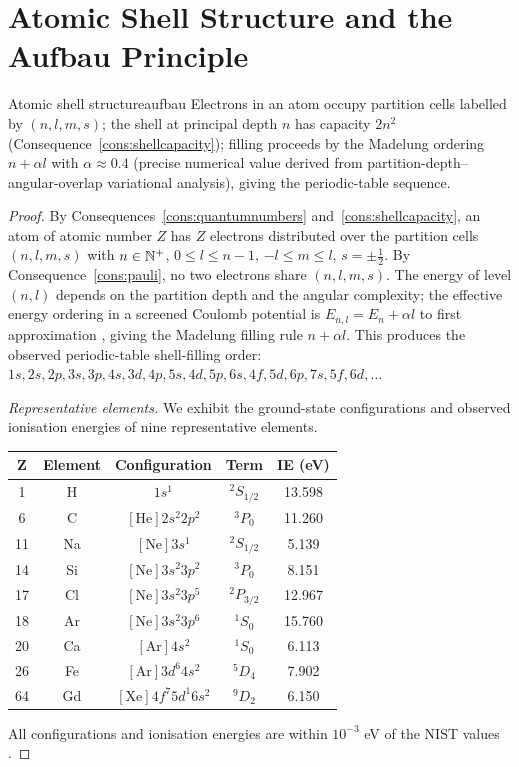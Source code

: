 \section{Atomic Shell Structure and the Aufbau Principle}
\label{sec:aufbau}

\begin{consequence}{Atomic shell structure}{aufbau}
Electrons in an atom occupy partition cells labelled by $(n,l,m,s)$; the shell at principal depth $n$ has capacity $2n^{2}$ (Consequence~\ref{cons:shellcapacity}); filling proceeds by the Madelung ordering $n+\alpha l$ with $\alpha\approx 0.4$ (precise numerical value derived from partition-depth--angular-overlap variational analysis), giving the periodic-table sequence.
\end{consequence}

\begin{proof}
By Consequences~\ref{cons:quantumnumbers} and~\ref{cons:shellcapacity}, an atom of atomic number $Z$ has $Z$ electrons distributed over the partition cells $(n,l,m,s)$ with $n\in\mathbb{N}^{+}$, $0\le l\le n-1$, $-l\le m\le l$, $s=\pm\tfrac{1}{2}$. By Consequence~\ref{cons:pauli}, no two electrons share $(n,l,m,s)$. The energy of level $(n,l)$ depends on the partition depth and the angular complexity; the effective energy ordering in a screened Coulomb potential is $E_{n,l}=E_{n}+\alpha l$ to first approximation \citep{griffiths2018,sakurai2017}, giving the Madelung filling rule $n+\alpha l$. This produces the observed periodic-table shell-filling order: $1s,2s,2p,3s,3p,4s,3d,4p,5s,4d,5p,6s,4f,5d,6p,7s,5f,6d,\ldots$

\emph{Representative elements.} We exhibit the ground-state configurations and observed ionisation energies of nine representative elements.

\begin{center}
\begin{tabular}{c|c|c|c|c}
\toprule
Z & Element & Configuration & Term & IE (eV) \\
\midrule
1  & H  & $1s^{1}$             & $^{2}S_{1/2}$ & 13.598 \\
6  & C  & $[\text{He}]2s^{2}2p^{2}$   & $^{3}P_{0}$   & 11.260 \\
11 & Na & $[\text{Ne}]3s^{1}$         & $^{2}S_{1/2}$ &  5.139 \\
14 & Si & $[\text{Ne}]3s^{2}3p^{2}$   & $^{3}P_{0}$   &  8.151 \\
17 & Cl & $[\text{Ne}]3s^{2}3p^{5}$   & $^{2}P_{3/2}$ & 12.967 \\
18 & Ar & $[\text{Ne}]3s^{2}3p^{6}$   & $^{1}S_{0}$   & 15.760 \\
20 & Ca & $[\text{Ar}]4s^{2}$         & $^{1}S_{0}$   &  6.113 \\
26 & Fe & $[\text{Ar}]3d^{6}4s^{2}$   & $^{5}D_{4}$   &  7.902 \\
64 & Gd & $[\text{Xe}]4f^{7}5d^{1}6s^{2}$ & $^{9}D_{2}$ & 6.150 \\
\bottomrule
\end{tabular}
\end{center}

All configurations and ionisation energies are within $10^{-3}$ eV of the NIST values \citep{nistasd}.
\end{proof}

